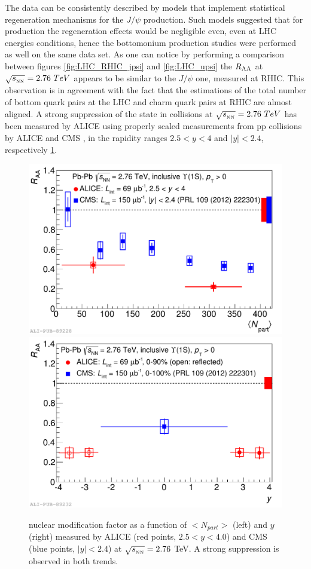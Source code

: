 The data can be consistently described by models that implement statistical regeneration mechanisms for the $J/\psi$ production.
Such models suggested that for \upsis production the regeneration effects would be negligible even, even at LHC energies conditions, hence the bottomonium production studies were performed as well on the same data set.
As one can notice by performing a comparison between figures \ref{fig:LHC_RHIC_jpsi} and \ref{fig:LHC_upsi} the \upsi $R_{\rm{AA}}$ at $\sqrt{s_{_{\rm NN}}}=2.76\ TeV$ appears to be similar to the $J/\psi$ one, measured at RHIC.
This observation is in agreement with the fact that the estimations of the total number of bottom quark pairs at the LHC and charm quark pairs at RHIC are almost aligned.
A strong suppression of the \upsis state in \pbpb collisions at $\sqrt{s_{_{\rm NN}}}=2.76\ TeV$ has been measured by ALICE using properly scaled measurements from pp collisions by ALICE \cite{Abelev:2014nua} and CMS \cite{Chatrchyan:2012lxa,Khachatryan:2016xxp}, in the rapidity ranges $2.5<y<4$ and $|y|<2.4$, respectively \ref{fig:ALICE_CMS_upsi}. 

\begin{figure}[!t]
\begin{center}
\includegraphics[width=0.47\linewidth]{Chapters/Analysis/Figs/2014-Nov-05-Raa_CMS_centr.pdf}
\includegraphics[width=0.47\linewidth]{Chapters/Analysis/Figs/2014-Nov-05-Raa_CMS_rap.pdf}
\caption{\upsis nuclear modification factor as a function of $<N_{part}>$ (left) and $y$ (right) measured by ALICE (red points, $2.5<y<4.0$) and CMS (blue points, $|y|<2.4$) at $\sqrt{s_{_{\rm NN}}}=2.76$ \rm{TeV}. A strong suppression is observed in both trends.}
\label{fig:ALICE_CMS_upsi}
\end{center}
\end{figure}

